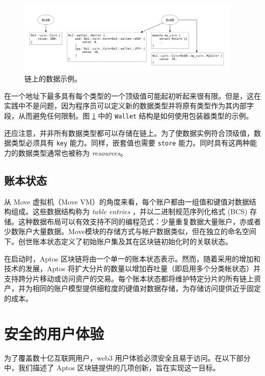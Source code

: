 \documentclass{article}
\begin{document}
\begin{figure}
\centering
\includegraphics[width=0.95\textwidth]{move_2.png}
\caption{\label{fig:move_data}链上的数据示例。}
\end{figure}

在一个地址下最多具有每个类型的一个顶级值可能起初听起来很有限。但是，这在实践中不是问题，因为程序员可以定义新的数据类型并将原有类型作为其内部字段，从而避免任何限制。图 \ref{fig:move_data} 中的 \texttt{Wallet} 结构是如何使用包装器类型的示例。

还应注意，并非所有数据类型都可以存储在链上。为了使数据实例符合顶级值，数据类型必须具有 \texttt{key} 能力。同样，嵌套值也需要 \texttt{store} 能力。同时具有这两种能力的数据类型通常也被称为 \emph{resources}。


\subsection{账本状态}
\label{sub:ledger_state}

从 Move 虚拟机（Move VM）的角度来看，每个账户都由一组值和键值对数据结构组成。这些数据结构称为 \emph{table entries} ，并以二进制规范序列化格式 (BCS) 存储。这种数据布局可以有效支持不同的编程范式：少量重复数据大量账户，亦或者少数账户大量数据。Move模块的存储方式与帐户数据类似，但在独立的命名空间下。创世账本状态定义了初始账户集及其在区块链初始化时的关联状态。 

在启动时，Aptos 区块链将由一个单一的账本状态表示。然而，随着采用的增加和技术的发展，Aptos 将扩大分片的数量以增加吞吐量（即启用多个分类帐状态）并支持跨分片移动或访问资产的交易。每个账本状态都将维护特定分片的所有链上资产，并为相同的账户模型提供细粒度的键值对数据存储，为存储访问提供近乎固定的成本。


\section{安全的用户体验}
\label{sec:user}

为了覆盖数十亿互联网用户，web3 用户体验必须安全且易于访问。在以下部分中，我们描述了 Aptos 区块链提供的几项创新，旨在实现这一目标。
\end{document}
